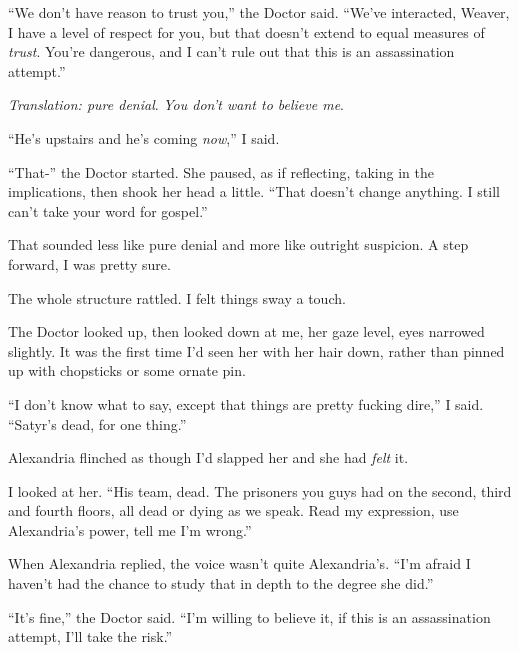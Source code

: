 ``We don't have reason to trust you,'' the Doctor said.  ``We've interacted, Weaver, I have a level of respect for you, but that doesn't extend to equal measures of \emph{trust}.  You're dangerous, and I can't rule out that this is an assassination attempt.''



\emph{Translation: pure denial}.  \emph{You don't want to believe me}.



``He's upstairs and he's coming \emph{now},'' I said.



``That-'' the Doctor started.  She paused, as if reflecting, taking in the implications, then shook her head a little.  ``That doesn't change anything.  I still can't take your word for gospel.''



That sounded less like pure denial and more like outright suspicion.  A step forward, I was pretty sure.



The whole structure rattled.  I felt things sway a touch.



The Doctor looked up, then looked down at me, her gaze level, eyes narrowed slightly.  It was the first time I'd seen her with her hair down, rather than pinned up with chopsticks or some ornate pin.



``I don't know what to say, except that things are pretty fucking dire,'' I said.  ``Satyr's dead, for one thing.''



Alexandria flinched as though I'd slapped her and she had \emph{felt} it.



I looked at her.  ``His team, dead.  The prisoners you guys had on the second, third and fourth floors, all dead or dying as we speak.  Read my expression, use Alexandria's power, tell me I'm wrong.''



When Alexandria replied, the voice wasn't quite Alexandria's.  ``I'm afraid I haven't had the chance to study that in depth to the degree she did.''



``It's fine,'' the Doctor said.  ``I'm willing to believe it, if this is an assassination attempt, I'll take the risk.''



